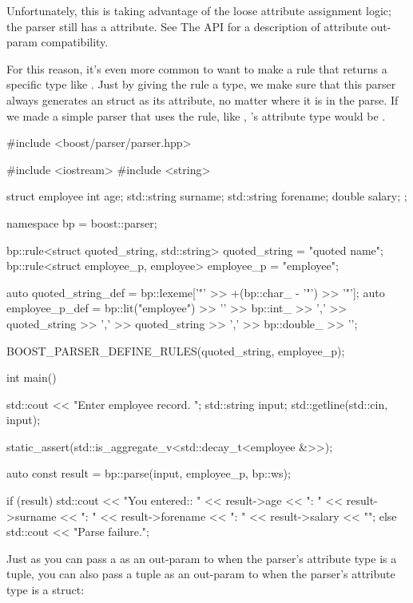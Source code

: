 \documentclass{MyBook}
\begin{document}
Unfortunately, this is taking advantage of the loose attribute assignment logic; the  parser still has a  attribute. See The  API for a description of attribute out-param compatibility.

For this reason, it's even more common to want to make a rule that returns a specific type like . Just by giving the rule a  type, we make sure that this parser always generates an  struct as its attribute, no matter where it is in the parse. If we made a simple parser  that uses the  rule, like , 's attribute type would be .

\begin{code}
#include <boost/parser/parser.hpp>

#include <iostream>
#include <string>


struct employee
{
    int age;
    std::string surname;
    std::string forename;
    double salary;
};

namespace bp = boost::parser;

bp::rule<struct quoted_string, std::string> quoted_string = "quoted name";
bp::rule<struct employee_p, employee> employee_p = "employee";

auto quoted_string_def = bp::lexeme['"' >> +(bp::char_ - '"') >> '"'];
auto employee_p_def = bp::lit("employee")
    >> '{'
    >> bp::int_ >> ','
    >> quoted_string >> ','
    >> quoted_string >> ','
    >> bp::double_
    >> '}';

BOOST_PARSER_DEFINE_RULES(quoted_string, employee_p);

int main()
{
    std::cout << "Enter employee record. ";
    std::string input;
    std::getline(std::cin, input);

    static_assert(std::is_aggregate_v<std::decay_t<employee &>>);

    auto const result = bp::parse(input, employee_p, bp::ws);

    if (result) {
        std::cout << "You entered:\nage:      " << result->age
                  << "\nsurname:  " << result->surname
                  << "\nforename: " << result->forename
                  << "\nsalary  : " << result->salary << "\n";
    } else {
        std::cout << "Parse failure.\n";
    }
}
\end{code}

Just as you can pass a  as an out-param to  when the parser's attribute type is a tuple, you can also pass a tuple as an out-param to  when the parser's attribute type is a struct:
\end{document}
